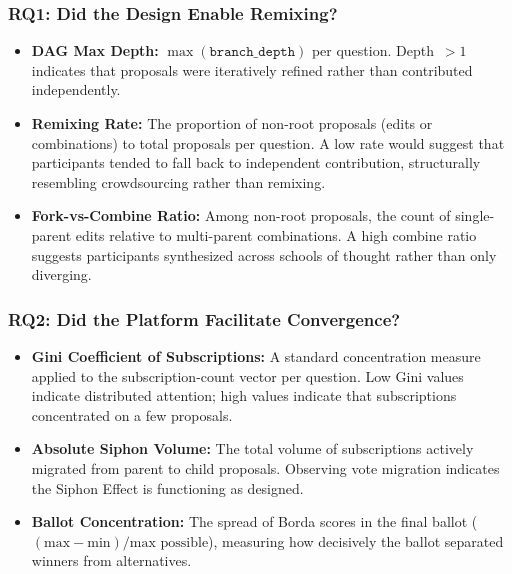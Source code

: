 \documentclass[a4paper, 12pt, twoside]{iviathesis}
\begin{document}
\subsubsection{RQ1: Did the Design Enable Remixing?}
\begin{itemize}
    \item \textbf{DAG Max Depth:} $\max(\texttt{branch\_depth})$ per question. Depth~$>1$ indicates that proposals were iteratively refined rather than contributed independently. 
    \item \textbf{Remixing Rate:} The proportion of non-root proposals (edits or combinations) to total proposals per question. A low rate would suggest that participants tended to fall back to independent contribution, structurally resembling crowdsourcing rather than remixing.
    \item \textbf{Fork-vs-Combine Ratio:} Among non-root proposals, the count of single-parent edits relative to multi-parent combinations. A high combine ratio suggests participants synthesized across schools of thought rather than only diverging.
\end{itemize}

\subsubsection{RQ2: Did the Platform Facilitate Convergence?}
\begin{itemize}
    \item \textbf{Gini Coefficient of Subscriptions:} A standard concentration measure applied to the subscription-count vector per question. Low Gini values indicate distributed attention; high values indicate that subscriptions concentrated on a few proposals.
    \item \textbf{Absolute Siphon Volume:} The total volume of subscriptions actively migrated from parent to child proposals. Observing vote migration indicates the Siphon Effect is functioning as designed.
    \item \textbf{Ballot Concentration:} The spread of Borda scores in the final ballot ($(\text{max} - \text{min}) / \text{max possible}$), measuring how decisively the ballot separated winners from alternatives.
\end{itemize}
\end{document}
